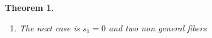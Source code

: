 \documentclass[12pt,a4paper]{book}      %
\newtheorem{thm}{Theorem}[section]
\theoremstyle{definition}
\begin{document}
\begin{thm}
\begin{enumerate}
\[\begin{tikzpicture}[baseline= (a).base]
\node[scale=.6] (a) at (0,0){
\begin{tikzcd}
        &               &                  &                                     &                                   &                                           & Y' \arrow[r] \arrow[rd]       & {Y_1^2}' \arrow[r] & \cdots \arrow[r] & {Y_{n_2'}^2}' \\
X = X_0 & X_1 \arrow[l] & \cdots \arrow[l] & X_{a-k_1-k_2-1} \arrow[l] \arrow[d] & X_{a-k_1-k_2} \arrow[l] \arrow[r] & X'_{a'-k_1'-k_2'-1} \arrow[rd] \arrow[ru] &                               & {Y_1^1}'           & \cdots \arrow[r] & {Y_{n_1'}^1}' \\
        &               &                  & Y \arrow[ld] \arrow[rd]             &                                   &                                           & X_{a'-k_1'-k_2'-2}' \arrow[r] & \cdots \arrow[r]   & X'_0             &               \\
        &               & Y_1^1 \arrow[d]  &                                     & Y_1^2 \arrow[d]                   &                                           &                               &                    &                  &               \\
        &               & \vdots \arrow[d] &                                     & \vdots \arrow[d]                  &                                           &                               &                    &                  &               \\
        &               & Y_{n_1}^1        &                                     & Y_{n_2}^2                         &                                           &                               &                    &                  &              
\end{tikzcd}
};
\end{tikzpicture}
\]
\item The next case is $s_1 = 0$ and two non general fibers
\[
\]
\end{enumerate}
\end{thm}
\end{document}
